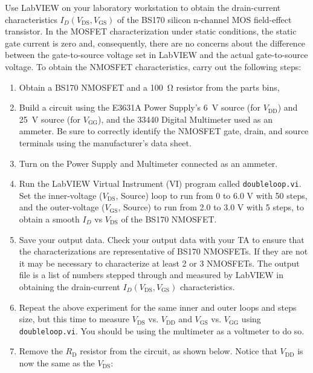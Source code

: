 \documentclass[12pt]{../manual}
\begin{document}
Use LabVIEW on your laboratory workstation to obtain the drain-current characteristics $I_D(V_{\mathrm{DS}}, V_{\mathrm{GS}})$ of the BS170 silicon n-channel MOS field-effect transistor. In the MOSFET characterization under static conditions, the static gate current is zero and, consequently, there are no concerns about the difference between the gate-to-source voltage set in LabVIEW and the actual gate-to-source voltage. To obtain the NMOSFET characteristics, carry out the following steps:
\begin{enumerate}
\item Obtain a BS170 NMOSFET and a \SI{100}{\ohm} resistor from the parts bins,
\item Build a circuit using the E3631A Power Supply's \SI{6}{\volt} source (for $V_{\mathrm{DD}}$) and \SI{+25}{\volt} source (for $V_{\mathrm{GG}}$), and the 33440 Digital Multimeter used as an ammeter. Be sure to correctly identify the NMOSFET gate, drain, and source terminals using the manufacturer's data sheet.
\item Turn on the Power Supply and Multimeter connected as an ammeter.
\item Run the LabVIEW Virtual Instrument (VI) program called {\tt doubleloop.vi}. Set the inner-voltage ($V_{\mathrm{DS}}$, Source) loop to run from 0 to 6.0 V with 50 steps, and the outer-voltage ($V_{\mathrm{GS}}$, Source) to run from 2.0 to 3.0 V with 5 steps, to obtain a smooth $I_D$ vs $V_{\mathrm{DS}}$ of the BS170 NMOSFET.
\item Save your output data. Check your output data with your TA to ensure that the characterizations are representative of BS170 NMOSFETs. If they are not it may be necessary to characterize at least 2 or 3 NMOSFETs. The output file is a list of numbers stepped through and measured by LabVIEW in obtaining the drain-current $I_D(V_{\mathrm{DS}}, V_{\mathrm{GS}})$ characteristics.
\item Repeat the above experiment for the same inner and outer loops and steps size, but this time to measure $V_{\mathrm{DS}}$ vs. $V_{\mathrm{DD}}$ and $V_{\mathrm{GS}}$ vs. $V_{\mathrm{GG}}$ using {\tt doubleloop.vi}. You should be using the multimeter as a voltmeter to do so. 
\item Remove the $R_{\mathrm{D}}$ resistor from the circuit, as shown below. Notice that $V_{\mathrm{DD}}$ is now the same as the $V_{\mathrm{DS}}$:
\end{enumerate}
\end{document}
